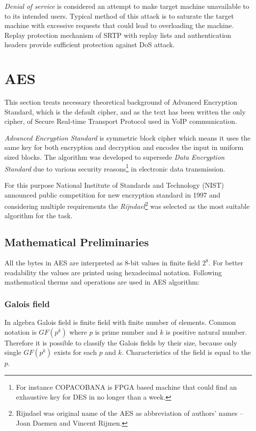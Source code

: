 \textit{Denial of service} is considered an attempt to make target machine 
unavailable to to its intended users. Typical method of this attack is to 
saturate the target machine with excessive requests that could lead to 
overloading the machine. Replay protection mechanism of SRTP with replay lists 
and authentication headers provide sufficient protection against DoS 
attack\cite{rfc3711, cisco:srtp}.

\section{AES}
This section treats necessary theoretical background of Advanced Encryption 
Standard, which is the default cipher, and as the text has been written the only
cipher, of Secure Real-time Transport Protocol used in VoIP communication.

\textit{Advanced Encryption Standard} is symmetric block cipher which means 
it uses the same key for both encryption and decryption and encodes the
input in uniform sized blocks. The algorithm was developed to supersede
\textit{Data Encryption Standard} due to various security reasons\footnote
{ For instance COPACOBANA is FPGA based machine that could find 
an exhaustive key for DES in no longer than a week\cite{copacobana}.} in 
electronic data transmission. 

For this purpose National Institute of Standards and Technology (NIST)
announced public competition for new encryption standard in 1997 and 
considering multiple requirements the \textit{Rijndael}\footnote{ Rijndael
was original name of the AES as abbreviation of authors' names -- Joan 
Daemen and Vincent Rijmen.} was selected as the most suitable algorithm
for the task\cite{AES-FIPS}. 

\subsection{Mathematical Preliminaries}
All the bytes in AES are interpreted as 8-bit values in finite field $2^8$.
For better readability the values are printed using hexadecimal notation.
Following mathematical therms and operations are used in AES algorithm:

\subsubsection*{Galois field}
In algebra Galois field is finite field with finite number of elements.
Common notation is $GF(p^k)$ where $p$ is prime number and $k$ is positive
natural number. Therefore it is possible to classify the Galois fields 
by their size, because only single $GF(p^k)$ exists for each $p$ and $k$.
Characteristics of the field is equal to the $p$.

